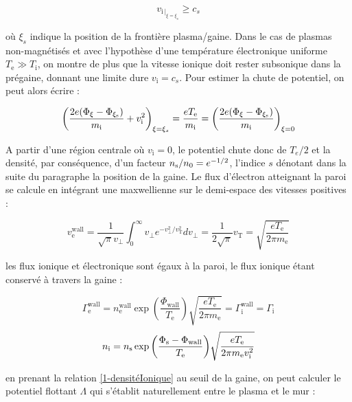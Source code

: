 \begin{refsection}
\begin{equation}
	v_{\text{i}\,|_{\xi=\xi_s}}\geq c_{s}
\end{equation}

où $\xi_s$ indique la position de la frontière plasma/gaine.
Dans le cas de plasmas non-magnétisés et avec l'hypothèse d'une température
électronique uniforme $T_\text{e}\gg T_\text{i}$, on montre de plus que la
vitesse ionique doit rester subsonique dans la prégaine, donnant une limite dure
$v_\text{i}=c_{s}$.
Pour estimer la chute de potentiel, on peut alors écrire :

\begin{equation}
	\left(\frac{2e(\Phi_{\xi}-\Phi_{\xi_\text{s}})}{m_\text{i}}+v_\text{i}^{{2}}\right)_{\xi=\xi_s}=
	\frac{eT_\text{e}}{m_\text{i}}=\left(\frac{2e(\Phi_{\xi}-\Phi_{\xi_\text{s}})}{m_\text{i}}\right)_{\xi=0}
\end{equation}

A partir d'une région centrale où $v_\text{i}=0$, le potentiel chute donc de
$T_{e}/2$ et la densité, par conséquence, d'un facteur
$n_\text{s}/n{_{0}}=e^{-1/2}$, l'indice $s$ dénotant dans la suite du
paragraphe la position de la gaine.
Le flux d'électron atteignant la paroi se calcule en intégrant une maxwellienne sur le
demi-espace des vitesses positives :

\begin{equation}
	v_\text{e}^\text{wall}=\frac{1}{\sqrt{\pi}v_\perp}\int_0^\infty
	v_\perp
	e^{-v_\perp^2/v_\text{T}^2}dv_\perp=\frac{1}{2\sqrt{\pi}}v_\text{T}=\sqrt{\frac{eT_\text{e}}{2\pi
	m_\text{e}}}
\end{equation}

les flux ionique et électronique sont égaux à la paroi, le flux ionique étant
conservé à travers la gaine :

\begin{equation}
	\Gamma_\text{e}^\text{wall}=n_\text{e}^\text{wall}\exp{\left(\frac{\Phi_\text{wall}}{T_\text{e}}\right)}\sqrt{\frac{eT_\text{e}}{2\pi
	m_\text{e}}}=\Gamma_\text{i}^\text{wall}=\Gamma_\text{i}
\end{equation}
\begin{equation}
\label{1-densitéIonique}
	n_\text{i}=n_\text{s}\exp{\left(\frac{\Phi_\text{s}-\Phi_\text{wall}}{T_\text{e}}\right)}\sqrt{\frac{eT_\text{e}}{2\pi
	m_\text{e}v_\text{i}^{{2}}}}
\end{equation}

en prenant la relation \ref{1-densitéIonique} au seuil de la gaine, on peut
calculer le potentiel flottant $\Lambda$ qui s'établit naturellement entre le
plasma et le mur :


\end{refsection}
